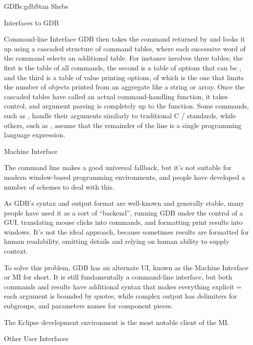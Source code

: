 \begin{aosachapter}{GDB}{s:gdb}{Stan Shebs}
\begin{aosasect1}{Interfaces to GDB}
\begin{aosasect2}{Command-line Interface}
GDB then takes the command returned by  and looks it up
using a cascaded structure of command tables, where each successive
word of the command selects an additional table.  For instance
 involves three tables; the first is the
table of all commands, the second is a table of options that can be
, and the third is a table of value printing options, of
which  is the one that limits the number of objects
printed from an aggregate like a string or array.  Once the cascaded
tables have called an actual command-handling function, it takes
control, and argument parsing is completely up to the function.  Some
commands, such as , handle their arguments similarly to
traditional C / standards, while others, such as
, assume that the remainder of the line is a single
programming language expression.

\end{aosasect2}

\begin{aosasect2}{Machine Interface}

The command line makes a good universal fallback, but it's not suitable
for modern window-based programming environments, and people have developed
a number of schemes to deal with this.

As GDB's syntax and output format are well-known and generally stable,
many people have used it as a sort of ``backend'', running GDB under the
control of a GUI, translating mouse clicks into commands, and
formatting print results into windows.  It's not the ideal approach,
because sometimes results are formatted for human readability, omitting
details and relying on human ability to supply context.

To solve this problem, GDB has an alternate UI, known as the Machine
Interface or MI for short.  It is still fundamentally a command-line
interface, but both commands and results have additional syntax that
makes everything explicit = each argument is bounded by quotes, while
complex output has delimiters for subgroups, and parameters names for
component pieces.


The Eclipse development environment is the most notable client of the
MI.

\end{aosasect2}

\begin{aosasect2}{Other User Interfaces}


\end{aosasect2}
\end{aosasect1}
\end{aosachapter}
